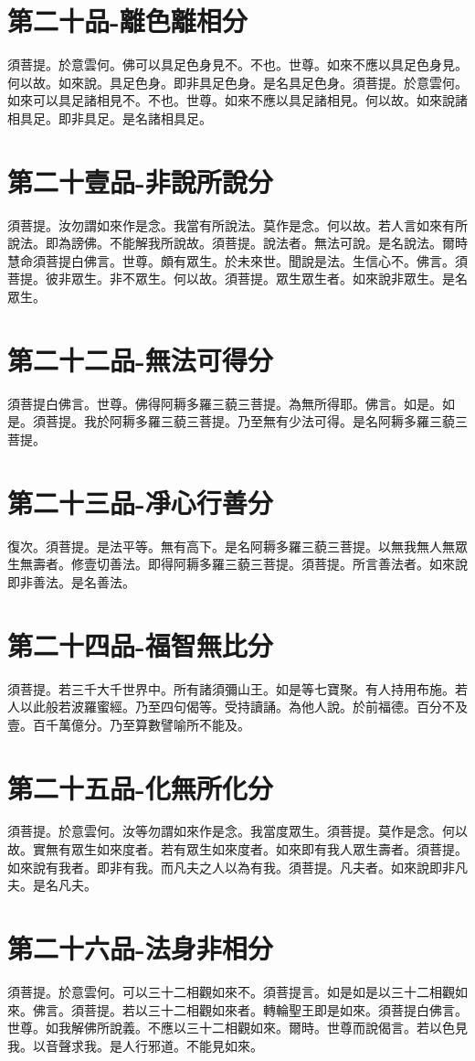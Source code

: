 \documentclass[a6paper, 22pt, twocolumn]{cvertbook}
\begin{document}
\chapter{第二十品-離色離相分}
\large 須菩提。於意雲何。佛可以具足色身見不。不也。世尊。如來不應以具足色身見。何以故。如來說。具足色身。即非具足色身。是名具足色身。須菩提。於意雲何。如來可以具足諸相見不。不也。世尊。如來不應以具足諸相見。何以故。如來說諸相具足。即非具足。是名諸相具足。
\chapter{第二十壹品-非說所說分}
\large 須菩提。汝勿謂如來作是念。我當有所說法。莫作是念。何以故。若人言如來有所說法。即為謗佛。不能解我所說故。須菩提。說法者。無法可說。是名說法。爾時慧命須菩提白佛言。世尊。頗有眾生。於未來世。聞說是法。生信心不。佛言。須菩提。彼非眾生。非不眾生。何以故。須菩提。眾生眾生者。如來說非眾生。是名眾生。
\chapter{第二十二品-無法可得分}
\large 須菩提白佛言。世尊。佛得阿耨多羅三藐三菩提。為無所得耶。佛言。如是。如是。須菩提。我於阿耨多羅三藐三菩提。乃至無有少法可得。是名阿耨多羅三藐三菩提。

\chapter{第二十三品-凈心行善分}
\large 復次。須菩提。是法平等。無有高下。是名阿耨多羅三藐三菩提。以無我無人無眾生無壽者。修壹切善法。即得阿耨多羅三藐三菩提。須菩提。所言善法者。如來說即非善法。是名善法。
\chapter{第二十四品-福智無比分}
\large 須菩提。若三千大千世界中。所有諸須彌山王。如是等七寶聚。有人持用布施。若人以此般若波羅蜜經。乃至四句偈等。受持讀誦。為他人說。於前福德。百分不及壹。百千萬億分。乃至算數譬喻所不能及。
\chapter{第二十五品-化無所化分}
\large 須菩提。於意雲何。汝等勿謂如來作是念。我當度眾生。須菩提。莫作是念。何以故。實無有眾生如來度者。若有眾生如來度者。如來即有我人眾生壽者。須菩提。如來說有我者。即非有我。而凡夫之人以為有我。須菩提。凡夫者。如來說即非凡夫。是名凡夫。
\chapter{第二十六品-法身非相分}
\large 須菩提。於意雲何。可以三十二相觀如來不。須菩提言。如是如是以三十二相觀如來。佛言。須菩提。若以三十二相觀如來者。轉輪聖王即是如來。須菩提白佛言。世尊。如我解佛所說義。不應以三十二相觀如來。爾時。世尊而說偈言。若以色見我。以音聲求我。是人行邪道。不能見如來。
\end{document}

